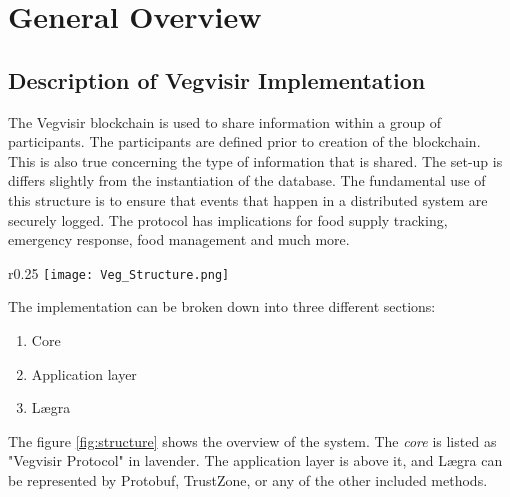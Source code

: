 \chapter{General Overview}

\section{Description of Vegvisir Implementation}

The Vegvisir blockchain is used to share information within a group of
participants. The participants are defined prior to creation of the blockchain.
This is also true concerning the type of information that is shared. The set-up
is differs slightly from the instantiation of the database. The fundamental
use of this structure is to ensure that events that happen in a distributed
system are securely logged. The protocol has implications for food supply
tracking, emergency response, food management and much more.

\begin{wrapfigure}{r}{0.25\textwidth}
    \texttt{[image: Veg\_Structure.png]}
    \caption{Vegvisir Structure}
    \label{fig:structure}
\end{wrapfigure}

The implementation can be broken down into three different sections:
\begin{enumerate}
    \item{ Core }
    \item{ Application layer }
    \item{ Lægra }
\end{enumerate}
The figure \ref{fig:structure} shows the overview of the system. The
\emph{core} is listed as "Vegvisir Protocol" in lavender. The application layer
is above it, and Lægra can be represented by Protobuf,
TrustZone, or any of the other included methods.

